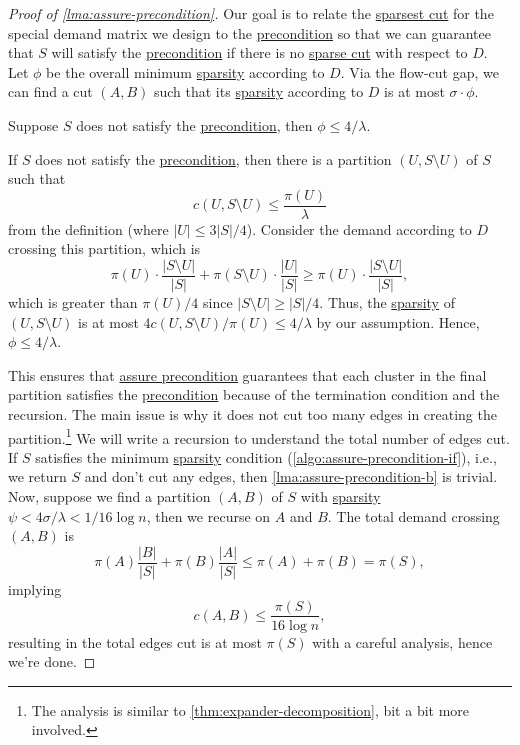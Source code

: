 \begin{proof}[Proof of \autoref{lma:assure-precondition}]
	Our goal is to relate the \hyperref[prb:non-uniform-sparsest-cut]{sparsest cut} for the special demand matrix we design to the \hyperref[def:precondition]{precondition} so that we can guarantee that \(S\) will satisfy the \hyperref[def:precondition]{precondition} if there is no \hyperref[prb:non-uniform-sparsest-cut]{sparse cut} with respect to \(D\). Let \(\phi \) be the overall minimum \hyperref[def:sparsity]{sparsity} according to \(D\). Via the flow-cut gap, we can find a cut \((A, B)\) such that its \hyperref[def:sparsity]{sparsity} according to \(D\) is at most \(\sigma \cdot \phi \).

	\begin{claim}
		Suppose \(S\) does not satisfy the \hyperref[def:precondition]{precondition}, then \(\phi \leq 4 / \lambda \).
	\end{claim}
	\begin{explanation}
		If \(S\) does not satisfy the \hyperref[def:precondition]{precondition}, then there is a partition \((U, S\setminus U)\) of \(S\) such that
		\[
			c(U, S\setminus U)
			\leq \frac{\pi (U)}{\lambda }
		\]
		from the definition (where \(\lvert U \rvert \leq 3 \lvert S \rvert / 4\)). Consider the demand according to \(D\) crossing this partition, which is
		\[
			\pi (U) \cdot \frac{\lvert S \setminus U \rvert }{\lvert S \rvert } + \pi (S\setminus U) \cdot \frac{\lvert U \rvert }{\lvert S \rvert }
			\geq \pi (U) \cdot \frac{\lvert S\setminus U \rvert }{\lvert S \rvert },
		\]
		which is greater than \(\pi (U) / 4\) since \(\lvert S\setminus U \rvert \geq \lvert S \rvert / 4\). Thus, the \hyperref[def:sparsity]{sparsity} of \((U, S\setminus U)\) is at most \(4c(U, S\setminus U) / \pi (U) \leq 4 / \lambda \) by our assumption. Hence, \(\phi \leq 4 / \lambda \).
	\end{explanation}
	This ensures that \hyperref[algo:assure-precondition]{assure precondition} guarantees that each cluster in the final partition satisfies the \hyperref[def:precondition]{precondition} because of the termination condition and the recursion. The main issue is why it does not cut too many edges in creating the partition.\footnote{The analysis is similar to \autoref{thm:expander-decomposition}, bit a bit more involved.} We will write a recursion to understand the total number of edges cut. If \(S\) satisfies the minimum \hyperref[def:sparsity]{sparsity} condition (\autoref{algo:assure-precondition-if}), i.e., we return \(S\) and don't cut any edges, then \autoref{lma:assure-precondition-b} is trivial. Now, suppose we find a partition \((A, B)\) of \(S\) with \hyperref[def:sparsity]{sparsity} \(\psi < 4 \sigma / \lambda < 1 / 16 \log n\), then we recurse on \(A\) and \(B\). The total demand crossing \((A, B)\) is
	\[
		\pi (A) \frac{\lvert B \rvert }{\lvert S \rvert } + \pi (B) \frac{\lvert A \rvert }{\lvert S \rvert }
		\leq \pi (A) + \pi (B)
		= \pi (S),
	\]
	implying
	\[
		c(A, B)
		\leq \frac{\pi (S)}{16 \log n},
	\]
	resulting in the total edges cut is at most \(\pi (S)\) with a careful analysis, hence we're done.
\end{proof}

